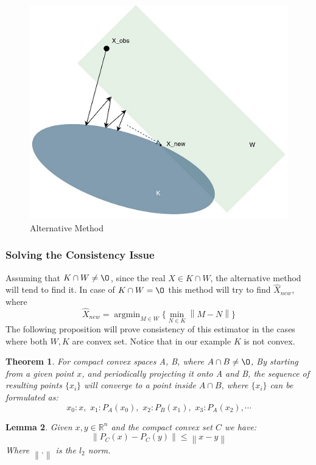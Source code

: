 \documentclass{amsart}
\newtheorem{theorem}{Theorem}[section]
\newtheorem{lemma}[theorem]{Lemma}
\theoremstyle{definition}
\theoremstyle{remark}
\numberwithin{equation}{section}
\newcommand\norm[1]{\left\lVert#1\right\rVert}
\newcommand{\blankbox}[2]{%
  \parbox{\columnwidth}{\centering
    \setlength{\fboxsep}{0pt}%
    \fbox{\raisebox{0pt}[#2]{\hspace{#1}}}%
  }%
}
\DeclareMathOperator*{\argmin}{argmin}
\begin{document}
\begin{figure}[tb]
\includegraphics{Proj.jpg}
\caption{Alternative Method}
\label{firstfig}
\end{figure}

\subsubsection{\textbf{Solving the Consistency Issue}} Assuming that $K\cap W\neq \O$, since the real $X\in K\cap W$, the alternative method will tend to find it. In case of $K\cap W=\O$ this method will try to find $\hat{X}_{new}$, where
\[
\hat{X}_{new} = \argmin_{M\in W} \{\min_{N\in K} \norm{M-N} \}
\]
The following proposition will prove consistency of this estimator in the cases where both $W,K$ are convex set. Notice that in our example $K$ is not convex.

\begin{theorem}
For compact convex spaces A, B,  where $A \cap B \neq \O $, By starting from a given point $x$, and periodically projecting it onto A and B, the sequence of resulting points $\{x_i\}$ will converge to a point inside $A \cap B $, where $\{x_i\}$ can be formulated as:
\[
x_0:x,\,\, x_1:P_A(x_0),\,\,x_2:P_B(x_1),\,\,x_3:P_A(x_2),\cdots
\]

\end{theorem}
\begin{lemma}
Given $x,y\in \mathbb{R}^n$ and the compact convex set $C$ we have:
\[
\norm{P_C(x)-P_C(y)}\leq \norm{x-y}
\]
Where $\norm{.}$ is the $l_2$ norm.

\end{lemma}
\end{document}
